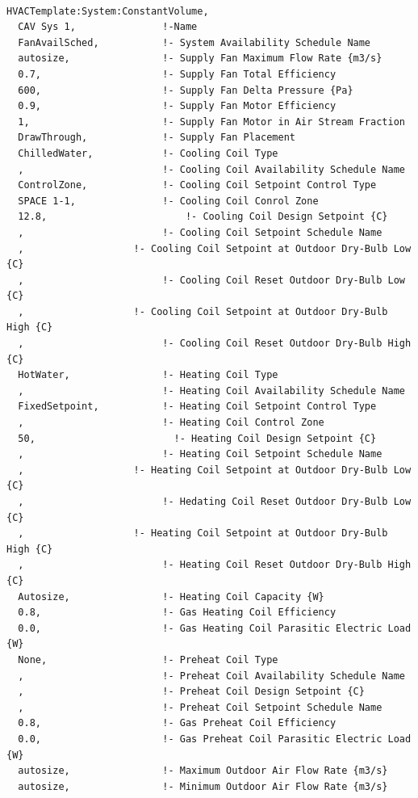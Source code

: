 \begin{lstlisting}

HVACTemplate:System:ConstantVolume,
  CAV Sys 1,               !-Name
  FanAvailSched,           !- System Availability Schedule Name
  autosize,                !- Supply Fan Maximum Flow Rate {m3/s}
  0.7,                     !- Supply Fan Total Efficiency
  600,                     !- Supply Fan Delta Pressure {Pa}
  0.9,                     !- Supply Fan Motor Efficiency
  1,                       !- Supply Fan Motor in Air Stream Fraction
  DrawThrough,             !- Supply Fan Placement
  ChilledWater,            !- Cooling Coil Type
  ,                        !- Cooling Coil Availability Schedule Name
  ControlZone,             !- Cooling Coil Setpoint Control Type
  SPACE 1-1,               !- Cooling Coil Conrol Zone
  12.8,                        !- Cooling Coil Design Setpoint {C}
  ,                        !- Cooling Coil Setpoint Schedule Name
  ,                   !- Cooling Coil Setpoint at Outdoor Dry-Bulb Low {C}
  ,                        !- Cooling Coil Reset Outdoor Dry-Bulb Low {C}
  ,                   !- Cooling Coil Setpoint at Outdoor Dry-Bulb High {C}
  ,                        !- Cooling Coil Reset Outdoor Dry-Bulb High {C}
  HotWater,                !- Heating Coil Type
  ,                        !- Heating Coil Availability Schedule Name
  FixedSetpoint,           !- Heating Coil Setpoint Control Type
  ,                        !- Heating Coil Control Zone
  50,                        !- Heating Coil Design Setpoint {C}
  ,                        !- Heating Coil Setpoint Schedule Name
  ,                   !- Heating Coil Setpoint at Outdoor Dry-Bulb Low {C}
  ,                        !- Hedating Coil Reset Outdoor Dry-Bulb Low {C}
  ,                   !- Heating Coil Setpoint at Outdoor Dry-Bulb High {C}
  ,                        !- Heating Coil Reset Outdoor Dry-Bulb High {C}
  Autosize,                !- Heating Coil Capacity {W}
  0.8,                     !- Gas Heating Coil Efficiency
  0.0,                     !- Gas Heating Coil Parasitic Electric Load {W}
  None,                    !- Preheat Coil Type
  ,                        !- Preheat Coil Availability Schedule Name
  ,                        !- Preheat Coil Design Setpoint {C}
  ,                        !- Preheat Coil Setpoint Schedule Name
  0.8,                     !- Gas Preheat Coil Efficiency
  0.0,                     !- Gas Preheat Coil Parasitic Electric Load {W}
  autosize,                !- Maximum Outdoor Air Flow Rate {m3/s}
  autosize,                !- Minimum Outdoor Air Flow Rate {m3/s}

\end{lstlisting}

